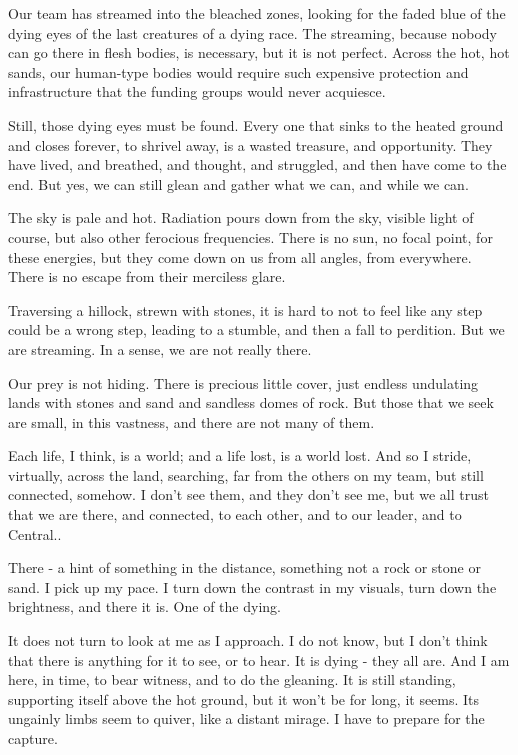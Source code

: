 Our team has streamed into the bleached zones, looking for the faded
blue of the dying eyes of the last creatures of a dying race. The
streaming, because nobody can go there in flesh bodies, is necessary,
but it is not perfect. Across the hot, hot sands, our human-type bodies
would require such expensive protection and infrastructure that the
funding groups would never acquiesce.

Still, those dying eyes must be found. Every one that sinks to the
heated ground and closes forever, to shrivel away, is a wasted treasure,
and opportunity. They have lived, and breathed, and thought, and
struggled, and then have come to the end. But yes, we can still glean
and gather what we can, and while we can.

The sky is pale and hot. Radiation pours down from the sky, visible
light of course, but also other ferocious frequencies. There is no sun,
no focal point, for these energies, but they come down on us from all
angles, from everywhere. There is no escape from their merciless glare.

Traversing a hillock, strewn with stones, it is hard to not to feel like
any step could be a wrong step, leading to a stumble, and then a fall to
perdition. But we are streaming. In a sense, we are not really there.

Our prey is not hiding. There is precious little cover, just endless
undulating lands with stones and sand and sandless domes of rock. But
those that we seek are small, in this vastness, and there are not many
of them.

Each life, I think, is a world; and a life lost, is a world lost. And so
I stride, virtually, across the land, searching, far from the others on
my team, but still connected, somehow. I don't see them, and they don't
see me, but we all trust that we are there, and connected, to each
other, and to our leader, and to Central..

There - a hint of something in the distance, something not a rock or
stone or sand. I pick up my pace. I turn down the contrast in my
visuals, turn down the brightness, and there it is. One of the dying.

It does not turn to look at me as I approach. I do not know, but I don't
think that there is anything for it to see, or to hear. It is dying -
they all are. And I am here, in time, to bear witness, and to do the
gleaning. It is still standing, supporting itself above the hot ground,
but it won't be for long, it seems. Its ungainly limbs seem to quiver,
like a distant mirage. I have to prepare for the capture.

